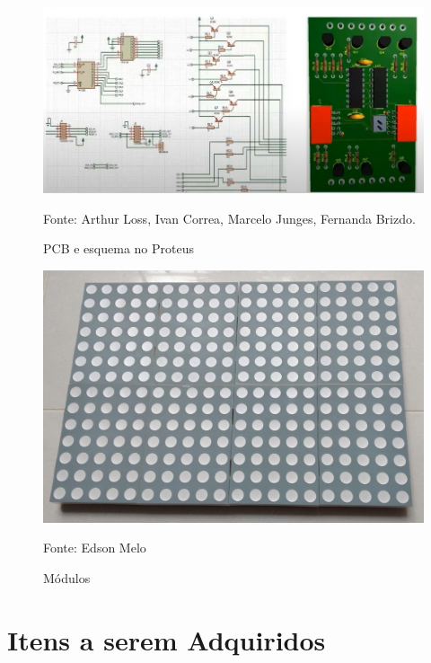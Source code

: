		\begin{figure}[H]
			\centering\footnotesize
			\caption{PCB e esquema no Proteus}
			\begin{center}
			    \includegraphics[scale=0.7]{imagens/PCP.jpg}
			\end{center}
			\label{fig:PCB}
			\par Fonte: Arthur Loss, Ivan Correa, Marcelo Junges, Fernanda Brizdo.
		\end{figure}
		\begin{figure}[H]
			\centering\footnotesize
			\caption{Módulos}
			\begin{center}
			    \includegraphics[scale=0.1]{imagens/20210812_111039.jpg}
			\end{center}
			\label{fig:modulo}
			\par Fonte: Edson Melo
		\end{figure}

\section{Itens a serem Adquiridos}

